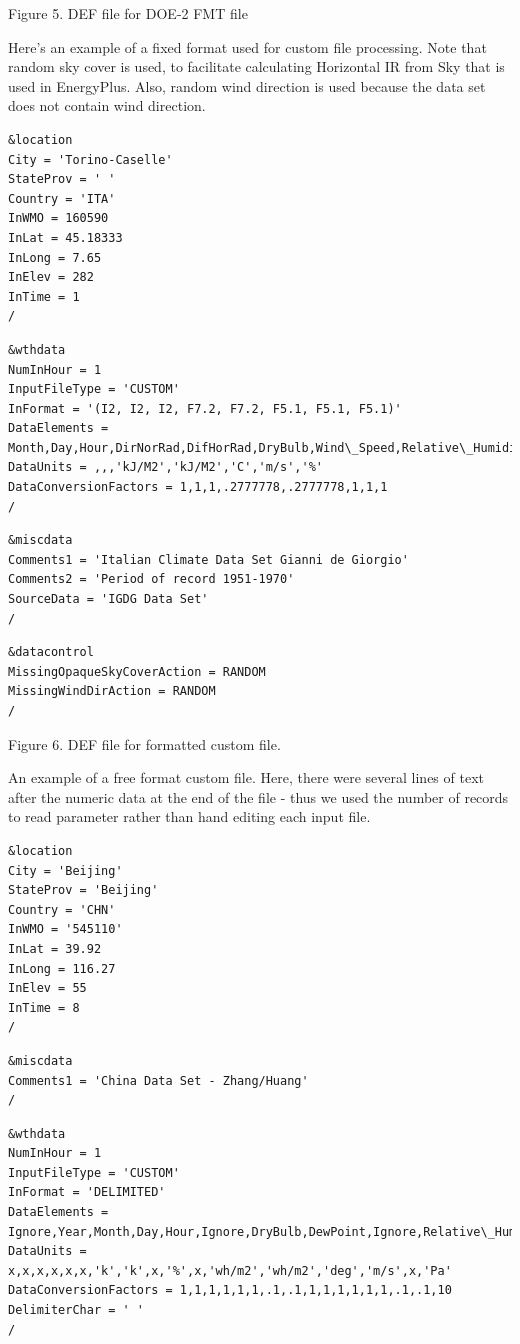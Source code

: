 Figure 5. DEF file for DOE-2 FMT file

Here's an example of a fixed format used for custom file processing. Note that random sky cover is used, to facilitate calculating Horizontal IR from Sky that is used in EnergyPlus. Also, random wind direction is used because the data set does not contain wind direction.

\begin{lstlisting}
&location
City = 'Torino-Caselle'
StateProv = ' '
Country = 'ITA'
InWMO = 160590
InLat = 45.18333
InLong = 7.65
InElev = 282
InTime = 1
/
\end{lstlisting}

\begin{lstlisting}
&wthdata
NumInHour = 1
InputFileType = 'CUSTOM'
InFormat = '(I2, I2, I2, F7.2, F7.2, F5.1, F5.1, F5.1)'
DataElements = Month,Day,Hour,DirNorRad,DifHorRad,DryBulb,Wind\_Speed,Relative\_Humidity
DataUnits = ,,,'kJ/M2','kJ/M2','C','m/s','%'
DataConversionFactors = 1,1,1,.2777778,.2777778,1,1,1
/
\end{lstlisting}

\begin{lstlisting}
&miscdata
Comments1 = 'Italian Climate Data Set Gianni de Giorgio'
Comments2 = 'Period of record 1951-1970'
SourceData = 'IGDG Data Set'
/
\end{lstlisting}

\begin{lstlisting}
&datacontrol
MissingOpaqueSkyCoverAction = RANDOM
MissingWindDirAction = RANDOM
/
\end{lstlisting}

Figure 6. DEF file for formatted custom file.

An example of a free format custom file. Here, there were several lines of text after the numeric data at the end of the file - thus we used the number of records to read parameter rather than hand editing each input file.

\begin{lstlisting}
&location
City = 'Beijing'
StateProv = 'Beijing'
Country = 'CHN'
InWMO = '545110'
InLat = 39.92
InLong = 116.27
InElev = 55
InTime = 8
/
\end{lstlisting}

\begin{lstlisting}
&miscdata
Comments1 = 'China Data Set - Zhang/Huang'
/
\end{lstlisting}

\begin{lstlisting}
&wthdata
NumInHour = 1
InputFileType = 'CUSTOM'
InFormat = 'DELIMITED'
DataElements = Ignore,Year,Month,Day,Hour,Ignore,DryBulb,DewPoint,Ignore,Relative\_Humidity,Ignore,DirNorRad,DifHorRad,WindDir,Wind\_Speed,OpaqSkyCvr,Atmos\_Pressure
DataUnits = x,x,x,x,x,x,'k','k',x,'%',x,'wh/m2','wh/m2','deg','m/s',x,'Pa'
DataConversionFactors = 1,1,1,1,1,1,.1,.1,1,1,1,1,1,1,.1,.1,10
DelimiterChar = ' '
/
\end{lstlisting}

